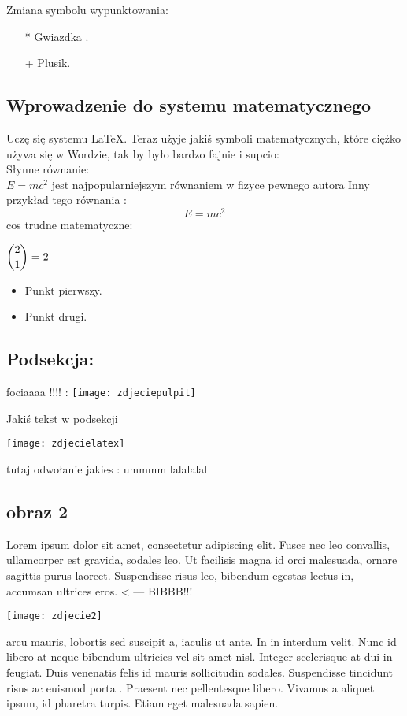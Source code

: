 \documentclass[12pt,a4paper]{article}
\begin{document}
Zmiana symbolu wypunktowania: 
\begin{itemize}
    \item[*] Gwiazdka .
    \item[+] Plusik.
\end{itemize}

\subsection{Wprowadzenie do systemu matematycznego}
Uczę się systemu \LaTeX. Teraz użyje jakiś symboli matematycznych, które ciężko używa się w Wordzie, tak by było bardzo fajnie i supcio: \\
Słynne równanie:  \\
$E = mc^2$ 
jest najpopularniejszym równaniem w fizyce pewnego autora
Inny przykład tego równania : 
$$E = mc^2$$ 
cos trudne matematyczne: 


$\dbinom{2}{1} = 2$
\begin{itemize}
    \item Punkt pierwszy.
    \item Punkt drugi. \cite{bib1}
\end{itemize}
\subsection{Podsekcja:}
fociaaaa !!!! : 
\texttt{[image: zdjeciepulpit]}

Jakiś tekst w podsekcji


\texttt{[image: zdjecielatex]}

tutaj odwołanie jakies :
ummmm\cite{bib5}
lalalalal\cite{bib6}
\subsection{obraz 2}


 Lorem ipsum dolor sit amet, consectetur adipiscing elit. Fusce nec leo convallis, ullamcorper est gravida, sodales leo. Ut facilisis magna id orci malesuada, ornare sagittis purus laoreet. Suspendisse risus leo, bibendum egestas lectus in, accumsan ultrices eros\cite{bib2}.  < --- BIBBB!!!

\texttt{[image: zdjecie2]} 


\underline{ arcu mauris, lobortis} sed suscipit a, iaculis ut ante. In in interdum velit. Nunc id libero at neque bibendum ultricies vel sit amet nisl. Integer scelerisque at dui in feugiat. Duis venenatis felis id mauris sollicitudin sodales. Suspendisse tincidunt risus ac euismod porta \cite{bib3} . Praesent nec pellentesque libero. Vivamus a aliquet ipsum, id pharetra turpis. Etiam eget malesuada sapien.
\end{document}
